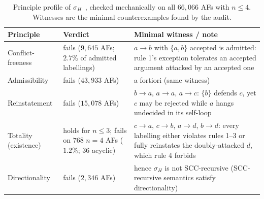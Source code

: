 \documentclass[review,12pt]{elsarticle}
\theoremstyle{definition}
\theoremstyle{remark}
\begin{document}
\begin{table}[t]
\centering
\small
\caption{Principle profile of $\sigma_H$~\citep{baroni2011}, checked
mechanically on all $66{,}066$ AFs with $n\le4$. Witnesses are the minimal
counterexamples found by the audit.}
\label{tab:sigmah}
\begin{tabular}{lp{2.9cm}p{6.0cm}}
\toprule
Principle & Verdict & Minimal witness / note\\
\midrule
Conflict-freeness & fails ($9{,}645$ AFs; $2.7\%$ of admitted labellings) &
$a\!\to\!b$ with $\{a,b\}$ accepted is admitted: rule 1's exception tolerates
an accepted argument attacked by an accepted one\\
Admissibility & fails ($43{,}933$ AFs) & a fortiori (same witness)\\
Reinstatement & fails ($15{,}078$ AFs) & $b\!\to\!a$, $a\!\to\!a$,
$a\!\to\!c$: $\{b\}$ defends $c$, yet $c$ may be rejected while $a$ hangs
undecided in its self-loop\\
Totality (existence) & holds for $n\le3$; fails on $768$ $n{=}4$ AFs
($1.2\%$; $36$ acyclic) & $c\!\to\!a$, $c\!\to\!b$, $a\!\to\!d$, $b\!\to\!d$:
every labelling either violates rules 1--3 or fully reinstates the
doubly-attacked $d$, which rule 4 forbids\\
Directionality & fails ($2{,}346$ AFs) & hence $\sigma_H$ is not
SCC-recursive (SCC-recursive semantics satisfy directionality)\\
\bottomrule
\end{tabular}
\end{table}
\end{document}
